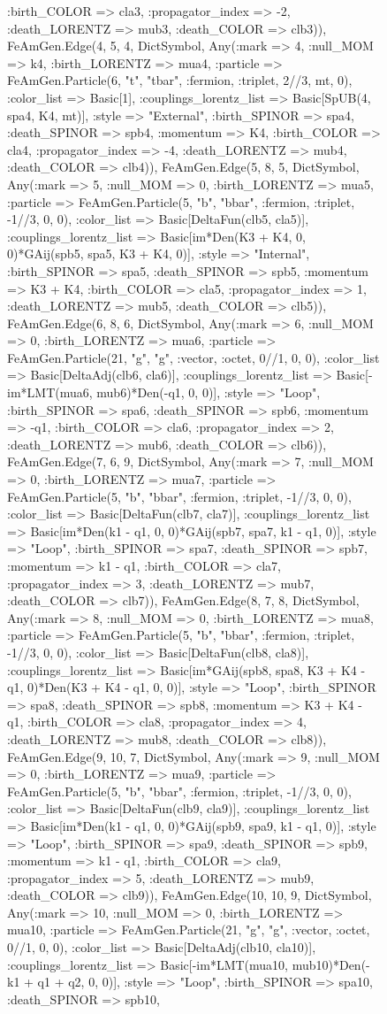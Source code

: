 \documentclass{revtex4}
\begin{document}
\begin{figure}[!htb]
\begin{center}
{:birth_COLOR => cla3, :propagator_index => -2, :death_LORENTZ => mub3, :death_COLOR => clb3)), FeAmGen.Edge(4, 5, 4, Dict{Symbol, Any}(:mark => 4, :null_MOM => k4, :birth_LORENTZ => mua4, :particle => FeAmGen.Particle(6, "t", "tbar", :fermion, :triplet, 2//3, mt, 0), :color_list => Basic[1], :couplings_lorentz_list => Basic[SpUB(4, spa4, K4, mt)], :style => "External", :birth_SPINOR => spa4, :death_SPINOR => spb4, :momentum => K4, :birth_COLOR => cla4, :propagator_index => -4, :death_LORENTZ => mub4, :death_COLOR => clb4)), FeAmGen.Edge(5, 8, 5, Dict{Symbol, Any}(:mark => 5, :null_MOM => 0, :birth_LORENTZ => mua5, :particle => FeAmGen.Particle(5, "b", "bbar", :fermion, :triplet, -1//3, 0, 0), :color_list => Basic[DeltaFun(clb5, cla5)], :couplings_lorentz_list => Basic[im*Den(K3 + K4, 0, 0)*GAij(spb5, spa5, K3 + K4, 0)], :style => "Internal", :birth_SPINOR => spa5, :death_SPINOR => spb5, :momentum => K3 + K4, :birth_COLOR => cla5, :propagator_index => 1, :death_LORENTZ => mub5, :death_COLOR => clb5)), FeAmGen.Edge(6, 8, 6, Dict{Symbol, Any}(:mark => 6, :null_MOM => 0, :birth_LORENTZ => mua6, :particle => FeAmGen.Particle(21, "g", "g", :vector, :octet, 0//1, 0, 0), :color_list => Basic[DeltaAdj(clb6, cla6)], :couplings_lorentz_list => Basic[-im*LMT(mua6, mub6)*Den(-q1, 0, 0)], :style => "Loop", :birth_SPINOR => spa6, :death_SPINOR => spb6, :momentum => -q1, :birth_COLOR => cla6, :propagator_index => 2, :death_LORENTZ => mub6, :death_COLOR => clb6)), FeAmGen.Edge(7, 6, 9, Dict{Symbol, Any}(:mark => 7, :null_MOM => 0, :birth_LORENTZ => mua7, :particle => FeAmGen.Particle(5, "b", "bbar", :fermion, :triplet, -1//3, 0, 0), :color_list => Basic[DeltaFun(clb7, cla7)], :couplings_lorentz_list => Basic[im*Den(k1 - q1, 0, 0)*GAij(spb7, spa7, k1 - q1, 0)], :style => "Loop", :birth_SPINOR => spa7, :death_SPINOR => spb7, :momentum => k1 - q1, :birth_COLOR => cla7, :propagator_index => 3, :death_LORENTZ => mub7, :death_COLOR => clb7)), FeAmGen.Edge(8, 7, 8, Dict{Symbol, Any}(:mark => 8, :null_MOM => 0, :birth_LORENTZ => mua8, :particle => FeAmGen.Particle(5, "b", "bbar", :fermion, :triplet, -1//3, 0, 0), :color_list => Basic[DeltaFun(clb8, cla8)], :couplings_lorentz_list => Basic[im*GAij(spb8, spa8, K3 + K4 - q1, 0)*Den(K3 + K4 - q1, 0, 0)], :style => "Loop", :birth_SPINOR => spa8, :death_SPINOR => spb8, :momentum => K3 + K4 - q1, :birth_COLOR => cla8, :propagator_index => 4, :death_LORENTZ => mub8, :death_COLOR => clb8)), FeAmGen.Edge(9, 10, 7, Dict{Symbol, Any}(:mark => 9, :null_MOM => 0, :birth_LORENTZ => mua9, :particle => FeAmGen.Particle(5, "b", "bbar", :fermion, :triplet, -1//3, 0, 0), :color_list => Basic[DeltaFun(clb9, cla9)], :couplings_lorentz_list => Basic[im*Den(k1 - q1, 0, 0)*GAij(spb9, spa9, k1 - q1, 0)], :style => "Loop", :birth_SPINOR => spa9, :death_SPINOR => spb9, :momentum => k1 - q1, :birth_COLOR => cla9, :propagator_index => 5, :death_LORENTZ => mub9, :death_COLOR => clb9)), FeAmGen.Edge(10, 10, 9, Dict{Symbol, Any}(:mark => 10, :null_MOM => 0, :birth_LORENTZ => mua10, :particle => FeAmGen.Particle(21, "g", "g", :vector, :octet, 0//1, 0, 0), :color_list => Basic[DeltaAdj(clb10, cla10)], :couplings_lorentz_list => Basic[-im*LMT(mua10, mub10)*Den(-k1 + q1 + q2, 0, 0)], :style => "Loop", :birth_SPINOR => spa10, :death_SPINOR => spb10, }
\end{center}
\end{figure}
\end{document}

